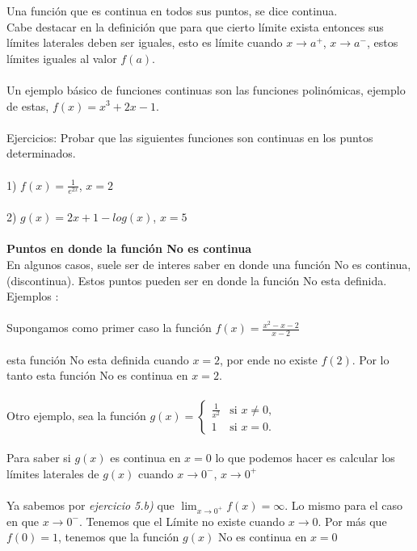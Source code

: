 \documentclass[11pt, a4paper]{article}
\begin{document}
{Una funci\'on que es continua en todos sus puntos, se dice continua. \\
Cabe destacar en la definici\'on que para que cierto l\'imite exista entonces sus l\'imites laterales deben ser iguales, esto es l\'imite cuando $x \to a^+$, $x \to a^-$, estos l\'imites iguales al valor $f(a)$. \\ \\ 
Un ejemplo b\'asico de funciones continuas son las funciones polin\'omicas, ejemplo de estas, $f(x) = x^3 + 2x - 1$. \\ \\ 
{\color{magenta} Ejercicios: 
Probar que las siguientes funciones son continuas en los puntos determinados. } \\ \\ 
1) $\displaystyle f(x) = \frac{1}{e^{2x}}$,  $x=2$ \\ \\
2) $g(x) = 2x + 1 - log(x) $, $x=5$ \\ \\ 
\textbf{Puntos en donde la funci\'on No es continua} \\ 
En algunos casos, suele ser de interes saber en donde una funci\'on No es continua, {\color{blue}(discontinua)}. Estos puntos pueden ser en donde la funci\'on No esta definida. 
\newpage
{\color{green} Ejemplos : } \\ \\ 
Supongamos como primer caso la funci\'on $ \displaystyle f(x)= \frac{x^2-x-2}{x-2}$ \\ \\ 
esta funci\'on No esta definida cuando $x = 2$, por ende no existe $f(2)$. Por lo tanto esta funci\'on No es continua en $x=2$. \\ \\ 
Otro ejemplo, sea la funci\'on $ \displaystyle
    g(x) = \begin{cases}
              \frac{1}{x^2} & \text{si } x \neq 0,\\
               1 & \text{si } x = 0.
          \end{cases}
  $ \\ \\ 
Para saber si $g(x)$ es continua en $x=0$ lo que podemos hacer es calcular los l\'imites laterales de $g(x)$ cuando $x \to 0^{-}$, $x \to 0^{+}$ \\ \\ 
Ya sabemos por \textit{ejercicio 5.b)} que $\displaystyle \lim_{x \to 0^{+}} f(x) = \infty $. Lo mismo para el caso en que $x \to 0^{-}$. Tenemos que el L\'imite no existe cuando $x \to 0$. Por m\'as que $f(0) = 1$, tenemos que la funci\'on $g(x)$ No es continua en $x = 0$  \\ \\ 

}
\end{document}
